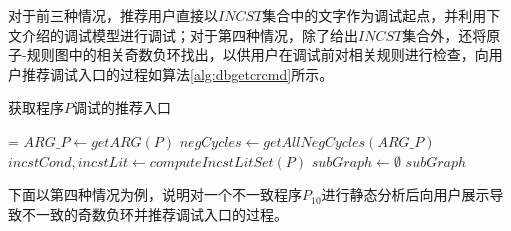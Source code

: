 对于前三种情况，推荐用户直接以$INCST$集合中的文字作为调试起点，并利用下文介绍的调试模型进行调试；对于第四种情况，除了给出$INCST$集合外，还将原子-规则图中的相关奇数负环找出，以供用户在调试前对相关规则进行检查，向用户推荐调试入口的过程如算法\ref{alg:dbgetcrcmd}所示。

\begin{algorithm2e}[H]
    \label{alg:dbgetcrcmd}
    \DontPrintSemicolon
    \SetNoFillComment
    \caption{获取程序$P$调试的推荐入口}
    \setcounter{AlgoLine}{0}
    \everypar={\nl}
    $ARG\_P \gets getARG(P)$ 
    $negCycles \gets getAllNegCycles(ARG\_P)$ 
    $incstCond, incstLit \gets computeIncstLitSet(P)$\;
    {
        $subGraph \gets \emptyset$\;
        \Return $subGraph$
    }
\end{algorithm2e}

下面以第四种情况为例，说明对一个不一致程序$P_{10}$进行静态分析后向用户展示导致不一致的奇数负环并推荐调试入口的过程。

